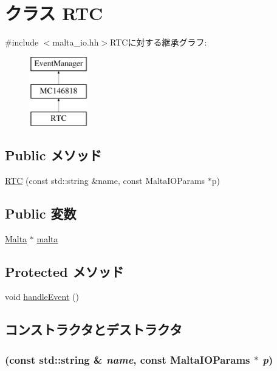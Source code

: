 \hypertarget{classMaltaIO_1_1RTC}{
\section{クラス RTC}
\label{classMaltaIO_1_1RTC}
}


{\ttfamily \#include $<$malta\_\-io.hh$>$}RTCに対する継承グラフ:\begin{figure}[H]
\begin{center}
\leavevmode
\includegraphics[height=3cm]{classMaltaIO_1_1RTC}
\end{center}
\end{figure}
\subsection*{Public メソッド}
\begin{DoxyCompactItemize}
\item 
\hyperlink{classMaltaIO_1_1RTC_a64c4a28f3a0384aa079f813034d0927c}{RTC} (const std::string \&name, const MaltaIOParams $\ast$p)
\end{DoxyCompactItemize}
\subsection*{Public 変数}
\begin{DoxyCompactItemize}
\item 
\hyperlink{classMalta}{Malta} $\ast$ \hyperlink{classMaltaIO_1_1RTC_ae7ba1afe6be03355de9c5cbc41c11f96}{malta}
\end{DoxyCompactItemize}
\subsection*{Protected メソッド}
\begin{DoxyCompactItemize}
\item 
void \hyperlink{classMaltaIO_1_1RTC_af592dd6aaf1c9c6af780a5cbc531417e}{handleEvent} ()
\end{DoxyCompactItemize}


\subsection{コンストラクタとデストラクタ}
\hypertarget{classMaltaIO_1_1RTC_a64c4a28f3a0384aa079f813034d0927c}{
\subsubsection[{RTC}]{ (const std::string \& {\em name}, \/  const MaltaIOParams $\ast$ {\em p})}}
\label{classMaltaIO_1_1RTC_a64c4a28f3a0384aa079f813034d0927c}


